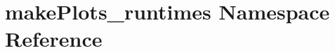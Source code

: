\hypertarget{namespacemakePlots__runtimes}{
\section{makePlots\_\-runtimes Namespace Reference}
\label{namespacemakePlots__runtimes}
}
